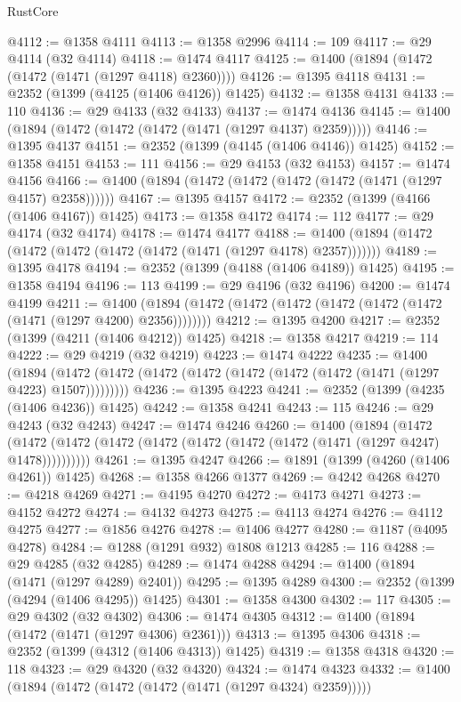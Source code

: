 \begin{lexlean}{RustCore}
\begin{coremodule}
@4112 := @1358 @4111
@4113 := @1358 @2996
@4114 := 109
@4117 := @29 @4114 (@32 @4114)
@4118 := @1474 @4117
@4125 := @1400 (@1894 (@1472 (@1472 (@1471 (@1297 @4118) @2360))))
@4126 := @1395 @4118
@4131 := @2352 (@1399 (@4125 (@1406 @4126)) @1425)
@4132 := @1358 @4131
@4133 := 110
@4136 := @29 @4133 (@32 @4133)
@4137 := @1474 @4136
@4145 := @1400 (@1894 (@1472 (@1472 (@1472 (@1471 (@1297 @4137) @2359)))))
@4146 := @1395 @4137
@4151 := @2352 (@1399 (@4145 (@1406 @4146)) @1425)
@4152 := @1358 @4151
@4153 := 111
@4156 := @29 @4153 (@32 @4153)
@4157 := @1474 @4156
@4166 := @1400 (@1894 (@1472 (@1472 (@1472 (@1472 (@1471 (@1297 @4157) @2358))))))
@4167 := @1395 @4157
@4172 := @2352 (@1399 (@4166 (@1406 @4167)) @1425)
@4173 := @1358 @4172
@4174 := 112
@4177 := @29 @4174 (@32 @4174)
@4178 := @1474 @4177
@4188 := @1400 (@1894 (@1472 (@1472 (@1472 (@1472 (@1472 (@1471 (@1297 @4178) @2357)))))))
@4189 := @1395 @4178
@4194 := @2352 (@1399 (@4188 (@1406 @4189)) @1425)
@4195 := @1358 @4194
@4196 := 113
@4199 := @29 @4196 (@32 @4196)
@4200 := @1474 @4199
@4211 := @1400 (@1894 (@1472 (@1472 (@1472 (@1472 (@1472 (@1472 (@1471 (@1297 @4200) @2356))))))))
@4212 := @1395 @4200
@4217 := @2352 (@1399 (@4211 (@1406 @4212)) @1425)
@4218 := @1358 @4217
@4219 := 114
@4222 := @29 @4219 (@32 @4219)
@4223 := @1474 @4222
@4235 := @1400
    (@1894 (@1472 (@1472 (@1472 (@1472 (@1472 (@1472 (@1472 (@1471 (@1297 @4223) @1507)))))))))
@4236 := @1395 @4223
@4241 := @2352 (@1399 (@4235 (@1406 @4236)) @1425)
@4242 := @1358 @4241
@4243 := 115
@4246 := @29 @4243 (@32 @4243)
@4247 := @1474 @4246
@4260 := @1400
    (@1894
      (@1472 (@1472 (@1472 (@1472 (@1472 (@1472 (@1472 (@1472 (@1471 (@1297 @4247) @1478))))))))))
@4261 := @1395 @4247
@4266 := @1891 (@1399 (@4260 (@1406 @4261)) @1425)
@4268 := @1358 @4266 @1377
@4269 := @4242 @4268
@4270 := @4218 @4269
@4271 := @4195 @4270
@4272 := @4173 @4271
@4273 := @4152 @4272
@4274 := @4132 @4273
@4275 := @4113 @4274
@4276 := @4112 @4275
@4277 := @1856 @4276
@4278 := @1406 @4277
@4280 := @1187 (@4095 @4278)
@4284 := @1288 (@1291 @932) @1808 @1213
@4285 := 116
@4288 := @29 @4285 (@32 @4285)
@4289 := @1474 @4288
@4294 := @1400 (@1894 (@1471 (@1297 @4289) @2401))
@4295 := @1395 @4289
@4300 := @2352 (@1399 (@4294 (@1406 @4295)) @1425)
@4301 := @1358 @4300
@4302 := 117
@4305 := @29 @4302 (@32 @4302)
@4306 := @1474 @4305
@4312 := @1400 (@1894 (@1472 (@1471 (@1297 @4306) @2361)))
@4313 := @1395 @4306
@4318 := @2352 (@1399 (@4312 (@1406 @4313)) @1425)
@4319 := @1358 @4318
@4320 := 118
@4323 := @29 @4320 (@32 @4320)
@4324 := @1474 @4323
@4332 := @1400 (@1894 (@1472 (@1472 (@1472 (@1471 (@1297 @4324) @2359)))))

\end{coremodule}
\end{lexlean}
